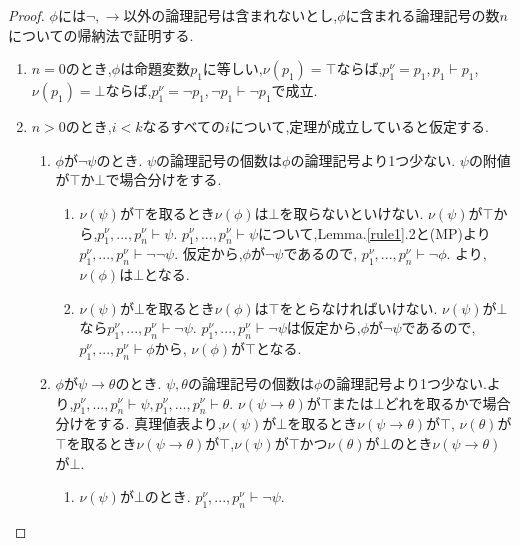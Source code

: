 \begin{proof}
 $\phi$には$\lnot, \to$以外の論理記号は含まれないとし,$\phi$に含まれる論理記号の数$n$についての帰納法で証明する.
 \begin{enumerate}
  \item $n=0$のとき,$\phi$は命題変数$p_1$に等しい,$\nu(p_1)=\top$ならば,$p_1^{\nu}=p_1, p_1 \vdash p_1$,$\nu(p_1)=\bot$ならば,$p_1^{\nu}=\lnot p_1, \lnot p_1 \vdash \lnot p_1$で成立.
  \item $n>0$のとき,$i<k$なるすべての$i$について,定理が成立していると仮定する.
		\begin{enumerate}
		 \renewcommand{\labelenumii}{\arabic{enumii})}
		 \renewcommand{\labelenumiii}{(\roman{enumiii})}
		 \item $\phi$が$\lnot \psi$のとき. \newline
			   $\psi$の論理記号の個数は$\phi$の論理記号より1つ少ない.
			   $\psi$の附値が$\top$か$\bot$で場合分けをする.
			   \begin{enumerate}
				\item $\nu(\psi)$が$\top$を取るとき$\nu(\phi)$は$\bot$を取らないといけない.
					  $\nu(\psi)$が$\top$から,$p_1^{\nu},...,p_n^{\nu} \vdash \psi$.
					  $p_1^{\nu},...,p_n^{\nu} \vdash \psi$について,Lemma.\ref{rule1}.2と(MP)より$p_1^{\nu},...,p_n^{\nu} \vdash \lnot \lnot \psi$.
					  仮定から,$\phi$が$\lnot \psi$であるので, $p_1^{\nu},...,p_n^{\nu} \vdash \lnot \phi$.
					  より,$\nu(\phi)$は$\bot$となる.
				\item $\nu(\psi)$が$\bot$を取るとき$\nu(\phi)$は$\top$をとらなければいけない.
					  $\nu(\psi)$が$\bot$なら$p_1^{\nu},...,p_n^{\nu} \vdash \lnot \psi$.
					  $p_1^{\nu},...,p_n^{\nu} \vdash \lnot \psi$は仮定から,$\phi$が$\lnot \psi$であるので, $p_1^{\nu},...,p_n^{\nu} \vdash \phi$から,
					  $\nu(\phi)$が$\top$となる.
			   \end{enumerate}
		 \item $\phi$が$\psi \to \theta$のとき. \newline
			   $\psi,\theta$の論理記号の個数は$\phi$の論理記号より1つ少ない.より,$p_1^{\nu},...,p_n^{\nu} \vdash \psi, p_1^{\nu},...,p_n^{\nu} \vdash \theta$.
			   $\nu(\psi \to \theta)$が$\top$または$\bot$どれを取るかで場合分けをする. 真理値表より,$\nu(\psi)$が$\bot$を取るとき$\nu(\psi \to \theta)$が$\top$,
			   $\nu(\theta)$が$\top$を取るとき$\nu(\psi \to \theta)$が$\top$,$\nu(\psi)$が$\top$かつ$\nu(\theta)$が$\bot$のとき$\nu(\psi \to \theta)$が$\bot$.
			   \begin{enumerate}
				\item $\nu(\psi)$が$\bot$のとき. $p_1^{\nu},...,p_n^{\nu} \vdash \lnot \psi$.

\end{enumerate}
\end{enumerate}
\end{enumerate}
\end{proof}
